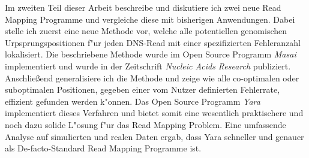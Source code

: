 Im zweiten Teil dieser Arbeit beschreibe und diskutiere ich zwei neue Read Mapping Programme und vergleiche diese mit bisherigen Anwendungen.
Dabei stelle ich zuerst eine neue Methode vor, welche alle potentiellen genomischen Urpsprungspositionen f"ur jeden DNS-Read mit einer spezifizierten Fehleranzahl lokalisiert.
Die beschriebene Methode wurde im Open Source Programm \emph{Masai} implementiert und wurde in der Zeitschrift \emph{Nucleic Acids Research} publiziert.
Anschlie{\ss}end generalisiere ich die Methode und zeige wie alle co-optimalen oder suboptimalen Positionen, gegeben einer vom Nutzer definierten Fehlerrate, effizient gefunden werden k"onnen.
Das Open Source Programm \emph{Yara} implementiert dieses Verfahren und bietet somit eine wesentlich praktischere und noch dazu solide L"osung f"ur das Read Mapping Problem.
Eine umfassende Analyse auf simulierten und realen Daten ergab, dass Yara schneller und genauer als De-facto-Standard Read Mapping Programme ist.


\newpage
